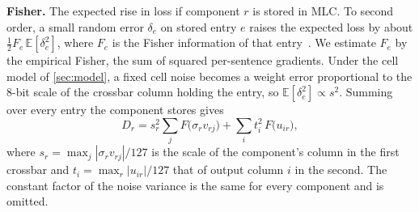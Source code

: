 \textbf{Fisher.} The expected rise in loss if component $r$ is stored in MLC. To second order, a small
random error $\delta_e$ on stored entry $e$ raises the expected loss by about $\tfrac12F_e\,\mathbb
E[\delta_e^2]$, where $F_e$ is the Fisher information of that entry~\cite{lecun1990obd}. We estimate $F_e$
by the empirical Fisher, the sum of squared per-sentence gradients. Under the cell model of
\cref{sec:model}, a fixed cell noise becomes a weight error proportional to the 8-bit scale of the
crossbar column holding the entry, so $\mathbb E[\delta_e^2]\propto s^2$. Summing over every entry the
component stores gives
\begin{equation}
D_r=s_r^2\sum_j F\big(\sigma_r v_{rj}\big)+\sum_i t_i^2\,F\big(u_{ir}\big),
\label{eq:fisher}
\end{equation}
where $s_r=\max_j|\sigma_r v_{rj}|/127$ is the scale of the component's column in the first crossbar and
$t_i=\max_r|u_{ir}|/127$ that of output column $i$ in the second. The constant factor of the noise variance
is the same for every component and is omitted.
